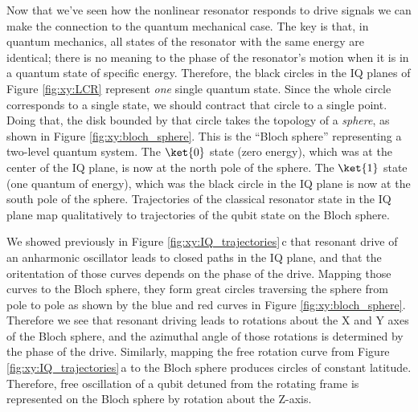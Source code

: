 


Now that we've seen how the nonlinear resonator responds to drive signals we can make the connection to the quantum mechanical case.
The key is that, in quantum mechanics, all states of the resonator with the same energy are identical; there is no meaning to the phase of the resonator's motion when it is in a quantum state of specific energy.
Therefore, the black circles in the IQ planes of Figure \ref{fig:xy:LCR} represent \emph{one} single quantum state.
Since the whole circle corresponds to a single state, we should contract that circle to a single point.
Doing that, the disk bounded by that circle takes the topology of a \emph{sphere}, as shown in Figure \ref{fig:xy:bloch_sphere}.
This is the ``Bloch sphere'' representing a two-level quantum system.
The $\ket{0}$ state (zero energy), which was at the center of the IQ plane, is now at the north pole of the sphere.
The $\ket{1}$ state (one quantum of energy), which was the black circle in the IQ plane is now at the south pole of the sphere.
Trajectories of the classical resonator state in the IQ plane map qualitatively to trajectories of the qubit state on the Bloch sphere.

We showed previously in Figure \ref{fig:xy:IQ_trajectories}\,c that resonant drive of an anharmonic oscillator leads to closed paths in the IQ plane, and that the oritentation of those curves depends on the phase of the drive.
Mapping those curves to the Bloch sphere, they form great circles traversing the sphere from pole to pole as shown by the blue and red curves in Figure \ref{fig:xy:bloch_sphere}.
Therefore we see that resonant driving leads to rotations about the X and Y axes of the Bloch sphere, and the azimuthal angle of those rotations is determined by the phase of the drive.
Similarly, mapping the free rotation curve from Figure \ref{fig:xy:IQ_trajectories}\,a to the Bloch sphere produces circles of constant latitude.
Therefore, free oscillation of a qubit detuned from the rotating frame is represented on the Bloch sphere by rotation about the Z-axis.

